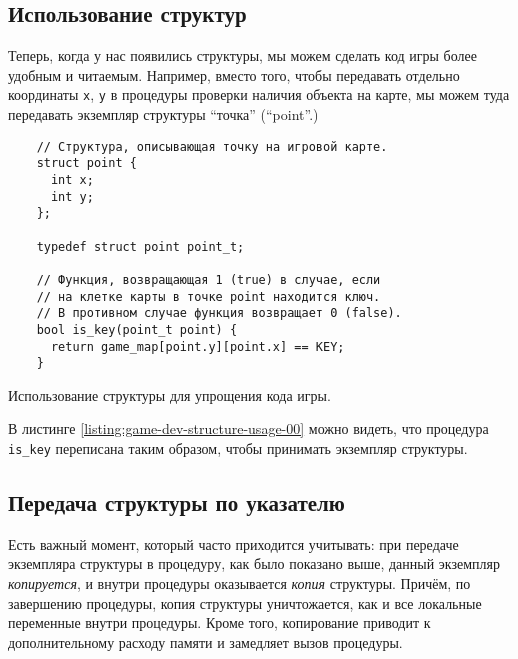 \documentclass[../sparc.tex]{subfiles}
\begin{document}
\subsection{Использование структур}

Теперь, когда у нас появились структуры, мы можем сделать код игры более удобным
и читаемым.  Например, вместо того, чтобы передавать отдельно координаты
\texttt{x}, \texttt{y} в процедуры проверки наличия объекта на
карте, мы можем туда передавать экземпляр структуры ``точка'' (``point''.)

\begin{listing}[H]
  \begin{verbatim}
    // Структура, описывающая точку на игровой карте.
    struct point {
      int x;
      int y;
    };

    typedef struct point point_t;

    // Функция, возвращающая 1 (true) в случае, если
    // на клетке карты в точке point находится ключ.
    // В противном случае функция возвращает 0 (false).
    bool is_key(point_t point) {
      return game_map[point.y][point.x] == KEY;
    }
  \end{verbatim}
  \caption{Использование структуры для упрощения кода игры.}
  \label{listing:game-dev-structure-usage-00}
\end{listing}

В листинге \ref{listing:game-dev-structure-usage-00} можно видеть, что процедура
\texttt{is_key} переписана таким образом, чтобы принимать экземпляр
структуры.

\subsection{Передача структуры по указателю}

Есть важный момент, который часто приходится учитывать: при передаче экземпляра
структуры в процедуру, как было показано выше, данный экземпляр
\emph{копируется}, и внутри процедуры оказывается \emph{копия} структуры.
Причём, по завершению процедуры, копия структуры уничтожается, как и все
локальные переменные внутри процедуры.  Кроме того, копирование приводит к
дополнительному расходу памяти и замедляет вызов процедуры.
\end{document}
